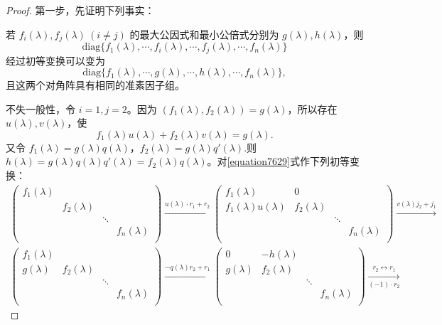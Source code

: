 \documentclass[../../main.tex]{subfiles}
\begin{document}
\begin{proof}
第一步，先证明下列事实：

若 $f_i(\lambda), f_j(\lambda)\ (i\neq j)$ 的最大公因式和最小公倍式分别为 $g(\lambda), h(\lambda)$，则
\[
\mathrm{diag}\{f_1(\lambda),\cdots,f_i(\lambda),\cdots,f_j(\lambda),\cdots,f_n(\lambda)\}
\]
经过初等变换可以变为
\[
\mathrm{diag}\{f_1(\lambda),\cdots,g(\lambda),\cdots,h(\lambda),\cdots,f_n(\lambda)\},
\]
且这两个对角阵具有相同的准素因子组。

不失一般性，令 $i = 1, j = 2$。因为 $(f_1(\lambda), f_2(\lambda)) = g(\lambda)$，所以存在 $u(\lambda), v(\lambda)$，使
\[
f_1(\lambda)u(\lambda)+f_2(\lambda)v(\lambda)=g(\lambda).
\]
又令 $f_1(\lambda)=g(\lambda)q(\lambda)$，$f_2(\lambda)=g(\lambda)q'(\lambda)$.则 $h(\lambda)=g(\lambda)q(\lambda)q'(\lambda)=f_2(\lambda)q(\lambda)$。对\eqref{equation7629}式作下列初等变换：
\begin{gather*}
\left( \begin{matrix}
f_1(\lambda )&		&		&		\\
&		f_2(\lambda )&		&		\\
&		&		\ddots&		\\
&		&		&		f_n(\lambda )\\
\end{matrix} \right) \xrightarrow{u(\lambda )\cdot r_1+r_2}\left( \begin{matrix}
f_1(\lambda )&		0&		&		\\
f_1(\lambda )u(\lambda )&		f_2(\lambda )&		&		\\
&		&		\ddots&		\\
&		&		&		f_n(\lambda )\\
\end{matrix} \right) \xrightarrow{v(\lambda )j_2+j_1}
\\
\left( \begin{matrix}
f_1(\lambda )&		&		&		\\
g(\lambda )&		f_2(\lambda )&		&		\\
&		&		\ddots&		\\
&		&		&		f_n(\lambda )\\
\end{matrix} \right) \xrightarrow{-q(\lambda )r_2+r_1}\left( \begin{matrix}
0&		-h(\lambda )&		&		\\
g(\lambda )&		f_2(\lambda )&		&		\\
&		&		\ddots&		\\
&		&		&		f_n(\lambda )\\
\end{matrix} \right) \underset{\left( -1 \right) \cdot r_2}{\xrightarrow{r_2\longleftrightarrow r_1}}

\end{gather*}
\end{proof}
\end{document}
